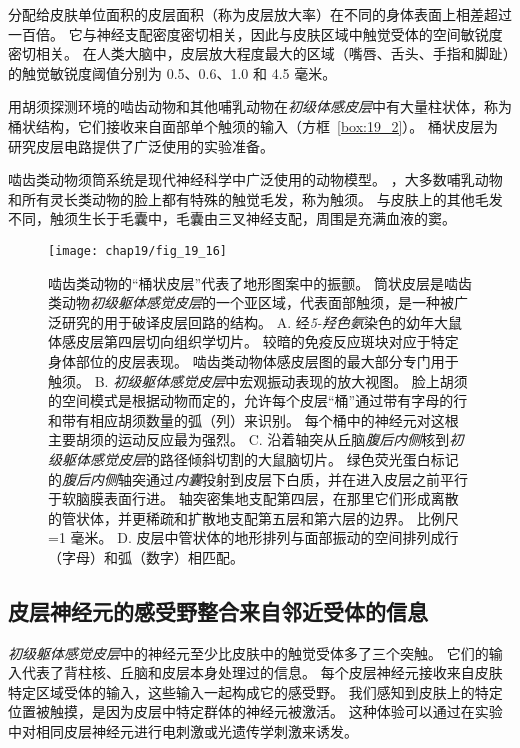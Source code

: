 分配给皮肤单位面积的皮层面积（称为皮层放大率）在不同的身体表面上相差超过一百倍。
它与神经支配密度密切相关，因此与皮肤区域中触觉受体的空间敏锐度密切相关。
在人类大脑中，皮层放大程度最大的区域（嘴唇、舌头、手指和脚趾）的触觉敏锐度阈值分别为 0.5、0.6、1.0 和 4.5 毫米。


用胡须探测环境的啮齿动物和其他哺乳动物在\textit{初级体感皮层}中有大量柱状体，称为桶状结构，它们接收来自面部单个触须的输入（方框~\ref{box:19_2}）。
桶状皮层为研究皮层电路提供了广泛使用的实验准备。



\begin{proposition}[啮齿动物须桶系统] \label{box:19_2}
	
	\quad \quad 啮齿类动物须筒系统是现代神经科学中广泛使用的动物模型。
	，大多数哺乳动物和所有灵长类动物的脸上都有特殊的触觉毛发，称为触须。
	与皮肤上的其他毛发不同，触须生长于毛囊中，毛囊由三叉神经支配，周围是充满血液的窦。
	
\end{proposition}


\begin{figure}[htbp]
	\centering
	\texttt{[image: chap19/fig\_19\_16]}
	\caption{啮齿类动物的“桶状皮层”代表了地形图案中的振颤。
		筒状皮层是啮齿类动物\textit{初级躯体感觉皮层}的一个亚区域，代表面部触须，是一种被广泛研究的用于破译皮层回路的结构。
		A. 经\textit{5-羟色氨}染色的幼年大鼠体感皮层第四层切向组织学切片。
		较暗的免疫反应斑块对应于特定身体部位的皮层表现。
		啮齿类动物体感皮层图的最大部分专门用于触须。
		B. \textit{初级躯体感觉皮层}中宏观振动表现的放大视图。
		脸上胡须的空间模式是根据动物而定的，允许每个皮层“桶”通过带有字母的行和带有相应胡须数量的弧（列）来识别。
		每个桶中的神经元对这根主要胡须的运动反应最为强烈。
		C. 沿着轴突从丘脑\textit{腹后内侧}核到\textit{初级躯体感觉皮层}的路径倾斜切割的大鼠脑切片。
		绿色荧光蛋白标记的\textit{腹后内侧}轴突通过\textit{内囊}投射到皮层下白质，并在进入皮层之前平行于软脑膜表面行进。
		轴突密集地支配第四层，在那里它们形成离散的管状体，并更稀疏和扩散地支配第五层和第六层的边界。
		比例尺=1 毫米。
		D. 皮层中管状体的地形排列与面部振动的空间排列成行（字母）和弧（数字）相匹配。}
	\label{fig:19_16}
\end{figure}



\subsection{皮层神经元的感受野整合来自邻近受体的信息}


\textit{初级躯体感觉皮层}中的神经元至少比皮肤中的触觉受体多了三个突触。
它们的输入代表了背柱核、丘脑和皮层本身处理过的信息。 
每个皮层神经元接收来自皮肤特定区域受体的输入，这些输入一起构成它的感受野。
我们感知到皮肤上的特定位置被触摸，是因为皮层中特定群体的神经元被激活。
这种体验可以通过在实验中对相同皮层神经元进行电刺激或光遗传学刺激来诱发。


